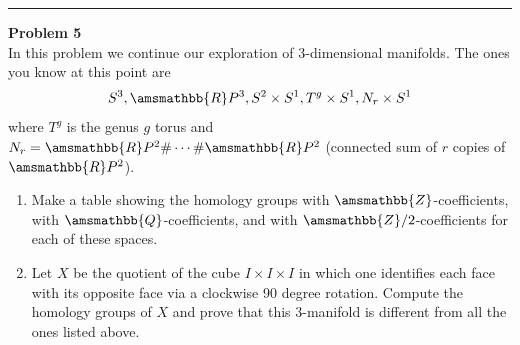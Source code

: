 \documentclass[a4paper, 12pt]{article}
\newenvironment{problem}[2][Problem]
    { \begin{mdframed}[backgroundcolor=gray!20] \textbf{#1 #2} \\}
    {  \end{mdframed}}
\renewcommand{\mathbb}{\amsmathbb}
\begin{document}
\noindent\rule{7in}{2.8pt}
\begin{problem}{5}
In this problem we continue our exploration of \(3\)-dimensional manifolds. The ones you know at this point are 
\[S^3, \mathbb{R}P^3, S^2\times S^1, T^g\times S^1, N_r\times S^1\]
where \(T^g\) is the genus \(g\) torus and \(N_r=\mathbb{R}P^2\#\cdots\# \mathbb{R}P^2\) (connected sum of \(r\) copies of \(\mathbb{R}P^2\)). 
\begin{enumerate}
\item Make a table showing the homology groups with \(\mathbb{Z}\)-coefficients, with \(\mathbb{Q}\)-coefficients, and with \(\mathbb{Z}/2\)-coefficients for each of these spaces. 
\item Let \(X\) be the quotient of the cube \(I\times I\times I\) in which one identifies each face with its opposite face via a clockwise 90 degree rotation. Compute the homology groups of \(X\) and prove that 
this 3-manifold is different from all the ones listed above. 
\end{enumerate}
\end{problem}
\end{document}
